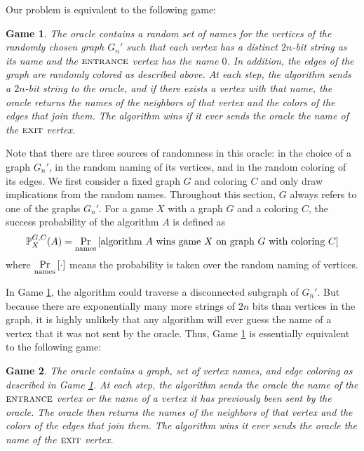 \documentclass[aps,11pt,twoside,nofootinbib,tightenlines,superscriptaddress,preprintnumbers]{revtex4}
\newcommand{\<}{\langle}
\renewcommand{\>}{\rangle}
\newcommand{\be}{\begin{equation}}
\newcommand{\ee}{\end{equation}}
\newcommand{\ent}{{\textsc{entrance}}}
\newcommand{\exit}{{\textsc{exit}}}
\newcommand\symProb{\mathop{\mathrm{Pr}}\displaylimits}
\def\prob#1#2{\symProb_{#1}\left[ #2 \right]}
\newtheorem{game}{Game}
\begin{document}
Our problem is equivalent to the following game:
\begin{game}\label{game:original}
  The oracle contains a random set of names for the vertices of the
  randomly chosen graph $G_n'$ such that each vertex has a distinct
  $2n$-bit string as its name and the $\ent$ vertex has the name $0$.  In
  addition, the edges of the graph are randomly colored as described
  above.
%
  At each step, the algorithm sends a $2n$-bit string to the oracle, and
  if there exists a vertex with that name, the oracle returns the names of
  the neighbors of that vertex and the colors of the edges that join
  them.
%
  The algorithm wins if it ever sends the oracle the name of the $\exit$
  vertex.
\end{game}

\noindent
Note that there are three sources of randomness in this oracle: in the
choice of a graph $G_n'$, in the random naming of its vertices, and in the
random coloring of its edges.  We first consider a fixed graph $G$ and
coloring $C$ and only draw implications from the random names.  Throughout
this section, $G$ always refers to one of the graphs $G_n'$.  For a game
$X$ with a graph $G$ and a coloring $C$, the success probability of the
algorithm $A$ is defined as
\be
  \mathbb{P}_X^{G,C}(A) =
  \prob{\mathrm{names}}
       {\mbox{\rm algorithm $A$ wins game $X$ on graph $G$ with coloring $C$}}
\ee
where $\displaystyle\prob{\mathrm{names}}{\cdot}$ means the probability is taken over
the random naming of vertices.

In Game \ref{game:original}, the algorithm could traverse a disconnected
subgraph of $G_n'$.  But because there are exponentially many more strings
of $2n$ bits than vertices in the graph, it is highly unlikely that any
algorithm will ever guess the name of a vertex that it was not sent by the
oracle.  Thus, Game \ref{game:original} is essentially equivalent to the
following game:

\begin{game}\label{game:tree}
  The oracle contains a graph, set of vertex names, and edge coloring as
  described in Game \ref{game:original}.
%
  At each step, the algorithm sends the oracle the name of the $\ent$
  vertex or the name of a vertex it has previously been sent by the
  oracle.  The oracle then returns the names of the neighbors of that
  vertex and the colors of the edges that join them.
%
  The algorithm wins it ever sends the oracle the name of the $\exit$
  vertex.
\end{game}
\end{document}
